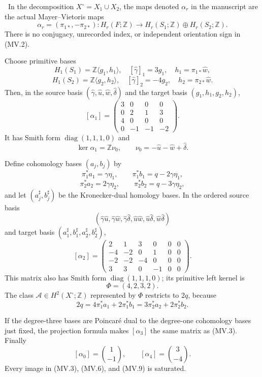 \begin{proposition}
\label{prop:actual-finite-band-maps}
\Verified\ In the decomposition $X^\circ=X_1\cup X_2$, the maps denoted
$\alpha_r$ in the manuscript are the actual Mayer--Vietoris maps
\[
 \alpha_r=(\pi_{1*},-\pi_{2*}):
 H_r(F;\mathbb Z)\longrightarrow
 H_r(S_1;\mathbb Z)\oplus H_r(S_2;\mathbb Z).
\tag{MV.2}
\]
There is no conjugacy, unrecorded index, or independent orientation sign in
(MV.2).

Choose primitive bases
\[
 H_1(S_1)=\mathbb Z\langle g_1,h_1\rangle,
 \quad [\widehat\gamma]_1=3g_1,\quad
 h_1=\pi_{1*}\widehat w,
\]
\[
 H_1(S_2)=\mathbb Z\langle g_2,h_2\rangle,
 \quad [\widehat\gamma]_2=-4g_2,\quad
 h_2=\pi_{2*}\widehat w.
\]
Then, in the source basis
$(\widehat\gamma,\widehat u,\widehat w,\widehat\delta)$ and the target
basis $(g_1,h_1,g_2,h_2)$,
\[
 [\alpha_1]=
 \begin{pmatrix}
 3&0&0&0\\
 0&2&1&3\\
 4&0&0&0\\
 0&-1&-1&-2
 \end{pmatrix}.
\tag{MV.3}
\]
It has Smith form $\operatorname{diag}(1,1,1,0)$ and
\[
 \ker\alpha_1=\mathbb Z\nu_0,
 \qquad
 \nu_0=-\widehat u-\widehat w+\widehat\delta.
\tag{MV.4}
\]

Define cohomology bases $(a_j,b_j)$ by
\[
 \pi_1^*a_1=\gamma\eta_1,
 \qquad \pi_1^*b_1=q-2\gamma\eta_1,
\]
\[
 \pi_2^*a_2=2\gamma\eta_2,
 \qquad \pi_2^*b_2=q-3\gamma\eta_2,
\tag{MV.5}
\]
and let $(a_j^\sharp,b_j^\sharp)$ be the Kronecker-dual homology bases.
In the ordered source basis
\[
(\widehat\gamma\widehat u,
 \widehat\gamma\widehat w,
 \widehat\gamma\widehat\delta,
 \widehat u\widehat w,
 \widehat u\widehat\delta,
 \widehat w\widehat\delta)
\]
and target basis
$(a_1^\sharp,b_1^\sharp,a_2^\sharp,b_2^\sharp)$,
\[
 [\alpha_2]=
 \begin{pmatrix}
  2& 1& 3& 0&0&0\\
 -4&-2& 0& 1&0&0\\
 -2&-2&-4& 0&0&0\\
  3& 3& 0&-1&0&0
 \end{pmatrix}.
\tag{MV.6}
\]
This matrix also has Smith form $\operatorname{diag}(1,1,1,0)$; its
primitive left kernel is
\[
 \Phi=(4,2,3,2).
\tag{MV.7}
\]
The class $\mathcal A\in H^2(X^\circ;\mathbb Z)$ represented by $\Phi$
restricts to $2q$, because
\[
 2q=4\pi_1^*a_1+2\pi_1^*b_1
    =3\pi_2^*a_2+2\pi_2^*b_2.
\tag{MV.8}
\]

If the degree-three bases are Poincar\'e dual to the degree-one cohomology
bases just fixed, the projection formula makes $[\alpha_3]$ the same matrix
as (MV.3).  Finally
\[
 [\alpha_0]=\binom{1}{-1},
 \qquad
 [\alpha_4]=\binom{3}{-4}.
\tag{MV.9}
\]
Every image in (MV.3), (MV.6), and (MV.9) is saturated.
\end{proposition}

